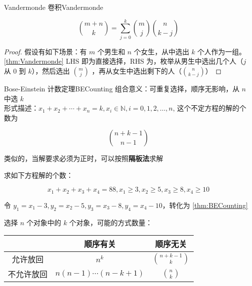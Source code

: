 \begin{theorem}{Vandermonde 卷积}{Vandermonde}
    
    $$
    \binom{m + n}{k} = \sum_{j = 0}^{k} \binom{m}{j} \binom{n}{k - j}
    $$
    
\end{theorem}

\begin{proof}
    假设有如下场景：有 $m$ 个男生和 $n$ 个女生，从中选出 $k$ 个人作为一组。\\
    
    \autoref{thm:Vandermonde} LHS 即为直接选择，RHS 为，枚举从男生中选出几个人（$j$ 从 $0$ 到 $k$），然后选出 $\binom{m}{j}$ ，再从女生中选出剩下的人（$\binom{n}{k - j}$）
\end{proof}

\begin{theorem}{Bose-Einstein 计数定理}{BECounting}
    组合意义：可重复选择，顺序无影响，从 $n$ 中选 $k$\\
    
    形式描述：$x_1 + x_2 + \cdots + x_n = k, x_i \in \mathbb{N}, i = 0, 1, 2, \dots, n$, 这个不定方程的解的个数为
    
    $$
    \binom{n + k - 1}{n - 1}
    $$
    
    类似的，当解要求必须为正时，可以按照\textbf{隔板法}求解
\end{theorem}

\begin{example}{}{}
    求如下方程解的个数：
    
    $$
    x_1 + x_2 + x_3 + x_4 = 88, x_1 \ge 3, x_2 \ge 5, x_3 \ge 8, x_4 \ge 10
    $$
    
    令 $y_1 = x_1 - 3, y_2 = x_2 - 5, y_3 = x_3 - 8, y_4 = x_4 - 10$，转化为 \autoref{thm:BECounting}
    
\end{example}

选择 \( n \) 个对象中的 \( k \) 个对象，可能的方式数量：

\begin{center}

\begin{tabular}{|c|c|c|}
\hline
& 顺序有关 & 顺序无关 \\
\hline
允许放回 & \( n^k \) & \( \displaystyle \binom{n+k-1}{k} \) \\
\hline
不允许放回 & \( n(n-1) \cdots (n-k+1) \) & \( \displaystyle \binom{n}{k} \) \\
\hline
\end{tabular}

\end{center}

